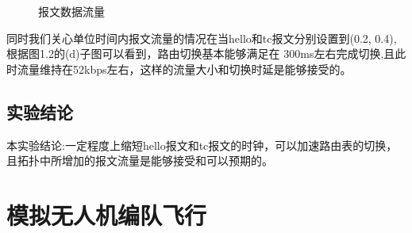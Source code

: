 \documentclass[a4paper,12pt]{report}
\begin{document}
\begin{spacing}{1.5}
\begin{figure}[hbtp]
\caption{报文数据流量}
\end{figure}


同时我们关心单位时间内报文流量的情况在当hello和tc报文分别设置到(0.2, 0.4),根据图1.2的(d)子图可以看到，路由切换基本能够满足在
300ms左右完成切换,且此时流量维持在52kbps左右，这样的流量大小和切换时延是能够接受的。

\section{实验结论}
本实验结论:一定程度上缩短hello报文和tc报文的时钟，可以加速路由表的切换，且拓扑中所增加的报文流量是能够接受和可以预期的。
\end{spacing}

\chapter{模拟无人机编队飞行}
\end{document}
